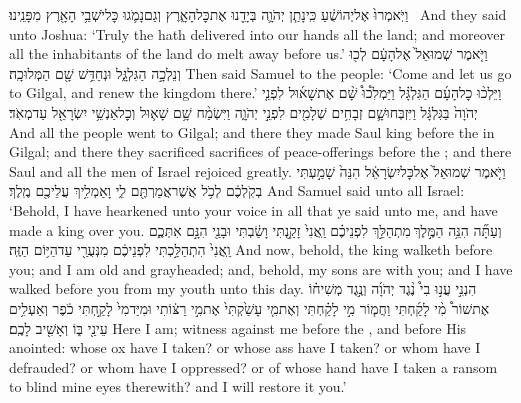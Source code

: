 {וַיֹּֽאמְרוּ֙ אֶל\maqqaf יְהוֹשֻׁ֔עַ כִּֽי\maqqaf נָתַ֧ן יְהֹוָ֛ה בְּיָדֵ֖נוּ אֶת\maqqaf כׇּל\maqqaf הָאָ֑רֶץ וְגַם\maqqaf נָמֹ֛גוּ כׇּל\maqqaf יֹשְׁבֵ֥י הָאָ֖רֶץ מִפָּנֵֽינוּ׃ \setuma }
{And they said unto Joshua: ‘Truly the \lord\space hath delivered into our hands all the land; and moreover all the inhabitants of the land do melt away before us.’}
\label{haft_38}
\setcounter{chap}{11}
\setcounter{verse}{14}
{וַיֹּ֤אמֶר שְׁמוּאֵל֙ אֶל\maqqaf הָעָ֔ם לְכ֖וּ וְנֵלְכָ֣ה הַגִּלְגָּ֑ל וּנְחַדֵּ֥שׁ שָׁ֖ם הַמְּלוּכָֽה׃}
{Then said Samuel to the people: ‘Come and let us go to Gilgal, and renew the kingdom there.’}
{וַיֵּלְכ֨וּ כׇל\maqqaf הָעָ֜ם הַגִּלְגָּ֗ל וַיַּמְלִ֩כוּ֩ שָׁ֨ם אֶת\maqqaf שָׁא֜וּל לִפְנֵ֤י יְהֹוָה֙ בַּגִּלְגָּ֔ל וַיִּזְבְּחוּ\maqqaf שָׁ֛ם זְבָחִ֥ים שְׁלָמִ֖ים לִפְנֵ֣י יְהֹוָ֑ה וַיִּשְׂמַ֨ח שָׁ֥ם שָׁא֛וּל וְכׇל\maqqaf אַנְשֵׁ֥י יִשְׂרָאֵ֖ל עַד\maqqaf מְאֹֽד׃ \petucha }
{And all the people went to Gilgal; and there they made Saul king before the \lord\space in Gilgal; and there they sacrificed sacrifices of peace-offerings before the \lord; and there Saul and all the men of Israel rejoiced greatly.}
\newperek
{}
{וַיֹּ֤אמֶר שְׁמוּאֵל֙ אֶל\maqqaf כׇּל\maqqaf יִשְׂרָאֵ֔ל הִנֵּה֙ שָׁמַ֣עְתִּי בְקֹֽלְכֶ֔ם לְכֹ֥ל אֲשֶׁר\maqqaf אֲמַרְתֶּ֖ם לִ֑י וָאַמְלִ֥יךְ עֲלֵיכֶ֖ם מֶֽלֶךְ׃}
{And Samuel said unto all Israel: ‘Behold, I have hearkened unto your voice in all that ye said unto me, and have made a king over you.}
{וְעַתָּ֞ה הִנֵּ֥ה הַמֶּ֣לֶךְ \legarmeh  מִתְהַלֵּ֣ךְ לִפְנֵיכֶ֗ם וַֽאֲנִי֙ זָקַ֣נְתִּי וָשַׂ֔בְתִּי וּבָנַ֖י הִנָּ֣ם אִתְּכֶ֑ם וַֽאֲנִי֙ הִתְהַלַּ֣כְתִּי לִפְנֵיכֶ֔ם מִנְּעֻרַ֖י עַד\maqqaf הַיּ֥וֹם הַזֶּֽה׃}
{And now, behold, the king walketh before you; and I am old and grayheaded; and, behold, my sons are with you; and I have walked before you from my youth unto this day.}
{הִנְנִ֣י עֲנ֣וּ בִי֩ נֶ֨גֶד יְהֹוָ֜ה וְנֶ֣גֶד מְשִׁיח֗וֹ אֶת\maqqaf שׁוֹר֩ \pasek  מִ֨י לָקַ֜חְתִּי וַחֲמ֧וֹר מִ֣י לָקַ֗חְתִּי וְאֶת\maqqaf מִ֤י עָשַׁ֙קְתִּי֙ אֶת\maqqaf מִ֣י רַצּ֔וֹתִי וּמִיַּד\maqqaf מִי֙ לָקַ֣חְתִּי כֹ֔פֶר וְאַעְלִ֥ים עֵינַ֖י בּ֑וֹ וְאָשִׁ֖יב לָכֶֽם׃}
{Here I am; witness against me before the \lord, and before His anointed: whose ox have I taken? or whose ass have I taken? or whom have I defrauded? or whom have I oppressed? or of whose hand have I taken a ransom to blind mine eyes therewith? and I will restore it you.’}
